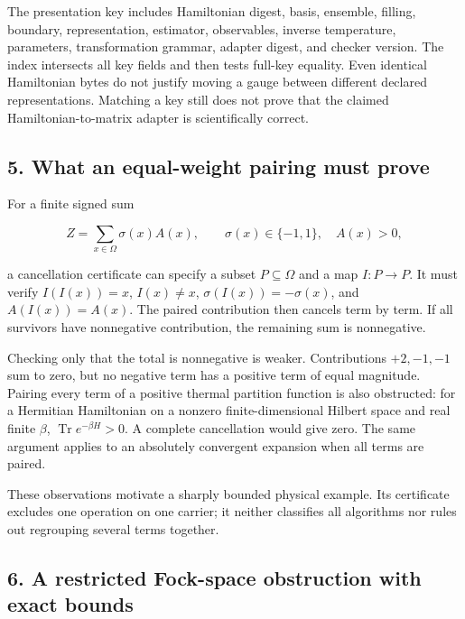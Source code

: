 \documentclass[
  11pt,
]{article}
\begin{document}
The presentation key includes Hamiltonian digest, basis, ensemble,
filling, boundary, representation, estimator, observables, inverse
temperature, parameters, transformation grammar, adapter digest, and
checker version. The index intersects all key fields and then tests
full-key equality. Even identical Hamiltonian bytes do not justify
moving a gauge between different declared representations. Matching a
key still does not prove that the claimed Hamiltonian-to-matrix adapter
is scientifically correct.

\hypertarget{what-an-equal-weight-pairing-must-prove}{%
\subsection{5. What an equal-weight pairing must
prove}\label{what-an-equal-weight-pairing-must-prove}}

For a finite signed sum

\[
Z=\sum_{x\in\Omega}\sigma(x)A(x),\qquad
\sigma(x)\in\{-1,1\},\quad A(x)>0,
\]

a cancellation certificate can specify a subset \(P\subseteq\Omega\) and
a map \(I:P\to P\). It must verify \(I(I(x))=x\), \(I(x)\neq x\),
\(\sigma(I(x))=-\sigma(x)\), and \(A(I(x))=A(x)\). The paired
contribution then cancels term by term. If all survivors have
nonnegative contribution, the remaining sum is nonnegative.

Checking only that the total is nonnegative is weaker. Contributions
\(+2,-1,-1\) sum to zero, but no negative term has a positive term of
equal magnitude. Pairing every term of a positive thermal partition
function is also obstructed: for a Hermitian Hamiltonian on a nonzero
finite-dimensional Hilbert space and real finite \(\beta\),
\(\operatorname{Tr}e^{-\beta H}>0\). A complete cancellation would give
zero. The same argument applies to an absolutely convergent expansion
when all terms are paired.

These observations motivate a sharply bounded physical example. Its
certificate excludes one operation on one carrier; it neither classifies
all algorithms nor rules out regrouping several terms together.

\hypertarget{a-restricted-fock-space-obstruction-with-exact-bounds}{%
\subsection{6. A restricted Fock-space obstruction with exact
bounds}\label{a-restricted-fock-space-obstruction-with-exact-bounds}}
\end{document}
